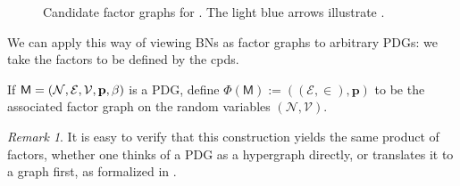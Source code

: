 \documentclass{article}
\theoremstyle{plain}
\theoremstyle{definition}
\theoremstyle{remark}
\newtheorem*{remark}{Remark}
\newcommand\mat[1]{\mathbf{#1}}
\newcommand{\V}{\mathcal V}
\newcommand{\N}{\mathcal N}
\newcommand{\Ed}{\mathcal E}
\newcommand{\sfM}{\mathsf M}
\numberwithin{equation}{section}
\begin{document}
\begin{figure}[htb]
\begin{subfigure}[b]{0.3\linewidth}
{}
			\caption{}\label{subfig:fg-smoking}
		\end{subfigure}%
		\caption{Candidate factor graphs for . The light blue arrows illustrate .}
		\label{fig:fg-intro-examples}
	\end{figure}

We can apply this way of viewing BNs as factor graphs to arbitrary
PDGs: we take the factors to be defined by the cpds.
	\begin{defn}
		If $\sfM = \mnvars[]$ is a PDG, define 
		$ \Phi(\sfM) := ((\Ed,\in), \mat p)$
		to be the associated factor graph on the random
                variables $(\N, \V)$. 
	\end{defn}
	\begin{remark}
		It is easy to verify that this construction yields the 
                same product of factors, whether one thinks of a PDG
                as a hypergraph directly, or translates it to a graph
                first, as formalized in . 
	\end{remark}
\end{document}
